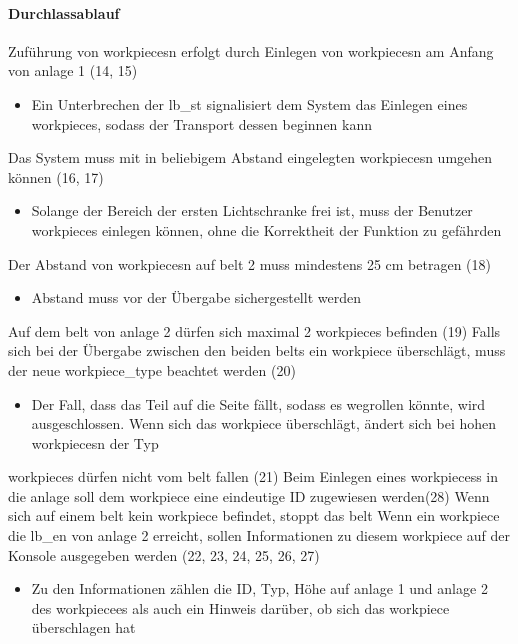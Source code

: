 \paragraph{Durchlassablauf}
\begin{itemize}
     Zuführung von \glspl{workpiece}n erfolgt durch Einlegen von \glspl{workpiece}n am Anfang von \gls{anlage} 1 (14, 15)
    \begin{itemize}
        \item Ein Unterbrechen der \gls{lb_st} signalisiert dem System das Einlegen eines \gls{workpiece}s,
        sodass der Transport dessen beginnen kann
    \end{itemize}
     Das System muss mit in beliebigem Abstand eingelegten \glspl{workpiece}n umgehen können (16, 17) %
    \begin{itemize}
        \item Solange der Bereich der ersten Lichtschranke frei ist, muss der Benutzer \glspl{workpiece}
        einlegen können, ohne die Korrektheit der Funktion zu gefährden
    \end{itemize}
     Der Abstand von \glspl{workpiece}n auf \gls{belt} 2 muss mindestens 25 cm betragen (18)
    \begin{itemize}
        \item Abstand muss vor der Übergabe sichergestellt werden
    \end{itemize}
     Auf dem \gls{belt} von \gls{anlage} 2 dürfen sich maximal 2 \glspl{workpiece} befinden (19)
     Falls sich bei der Übergabe zwischen den beiden \glspl{belt} ein \gls{workpiece}
    überschlägt, muss der neue \gls{workpiece_type} beachtet werden (20)
    \begin{itemize}
        \item Der Fall, dass das Teil auf die Seite fällt, sodass es wegrollen könnte, wird ausgeschlossen.
        Wenn sich das \gls{workpiece} überschlägt, ändert sich bei hohen \glspl{workpiece}n der Typ
    \end{itemize}
     \Glspl{workpiece} dürfen nicht vom \gls{belt} fallen (21)
     Beim Einlegen eines \glspl{workpiece}s in die \gls{anlage} soll dem \gls{workpiece} eine eindeutige ID zugewiesen werden(28)
     Wenn sich auf einem \gls{belt} kein \gls{workpiece} befindet, stoppt das \gls{belt}
     Wenn ein \gls{workpiece} die \gls{lb_en} von \gls{anlage} 2 erreicht,
    sollen Informationen zu diesem \gls{workpiece} auf der Konsole ausgegeben werden (22, 23, 24, 25, 26, 27)
    \begin{itemize}
        \item Zu den Informationen zählen die ID, Typ, Höhe auf \gls{anlage} 1 und \gls{anlage} 2 des \gls{workpiece}es als
        auch ein Hinweis darüber, ob sich das \gls{workpiece} überschlagen hat
    \end{itemize}
\end{itemize}

